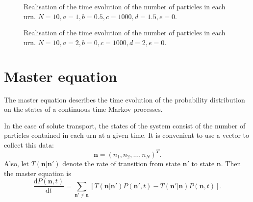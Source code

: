 \documentclass[a4paper,11pt]{article}
\numberwithin{equation}{section}
\newcommand{\diff}[2]{\frac{\mathrm{d} #1}{\mathrm{d} #2}}
\newcommand{\V}[1]{\mathbf{#1}}
\begin{document}
\begin{figure}[ht!]
    \centering
    {
    }

    \caption{\label{fig:exreal1}Realisation of the time evolution of the number
of particles in each urn. \(N=10,a=1,b=0.5,c=1000,d=1.5,e=0\).}
\end{figure}

\begin{figure}[ht!]
    \centering
    {
    }

    \caption{\label{fig:exreal2}Realisation of the time evolution of the number
of particles in each urn. \(N=10,a=2,b=0,c=1000,d=2,e=0\).}
\end{figure}

\FloatBarrier

\section{Master equation}
The master equation describes the time evolution of the probability distribution
on the states of a continuous time Markov processes.

%

In the case of solute transport, the states of the system consist of the number
of particles contained in each urn at a given time. It is convenient to use a
vector to collect this data:
\begin{equation}
    \label{eqn:state_vector}
    \V{n} = \left(n_1,n_2, \dotsc, n_N\right)^{T}.
\end{equation}
Also, let \(T(\V{n}|\V{n}')\) denote the rate of transition from state \(\V{n}'\)
to state \(\V{n}\). Then the master equation is \citep{mckane2012stochastic}
\begin{equation}
    \label{eqn:master_eqn_rates}
    \diff{P(\V{n},t)}{t} = \sum_{\V{n}' \neq \V{n}} \left[ T(\V{n}|\V{n}')
        P(\V{n}',t) - T(\V{n}'|\V{n}) P(\V{n},t) \right].
\end{equation}
\end{document}
